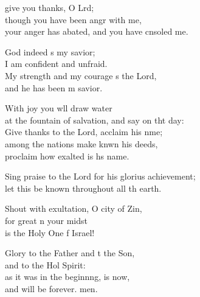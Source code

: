 \settowidth{\versewidth}{Sing praise to the Lord for his glorious achievement; *}
\begin{psalmverse}%
  \begin{patverse}
     give you thanks, O Lrd;\Flex\\
though you have been angr with me,\Med\\
your anger has abated, and you have cnsoled me.

God indeed \pointup{\i}s my savior;\Med\\
I am confident and unfraid.\\
My strength and my courage \pointup{\i}s the Lord,\Med\\
and he has been m savior.

With joy you w\pointup{\i}ll draw water\Med\\
at the fountain of salvation, and say on tht day:\\
Give thanks to the Lord, acclaim his nme;\Flex\\
among the nations make knwn his deeds,\Med\\
proclaim how exalted is h\pointup{\i}s name.

Sing praise to the Lord for his glorius achievement;\Med\\
let this be known throughout all th earth.

Shout with exultation, O city of Zin,\Flex\\
for great \pointup{\i}n your midst\Med\\
is the Holy One f Israel!

Glory to the Father and t the Son,\Med\\
and to the Hol Spirit:\\
as it was in the beginn\pointup{\i}ng, is now,\Med\\
and will be forever. men. 
  \end{patverse}
\end{psalmverse}
